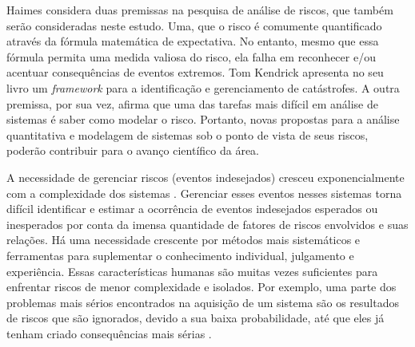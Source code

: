 Haimes \cite{Haimes2009} considera duas premissas na pesquisa de análise de riscos, que também serão consideradas neste estudo. Uma, que o risco é comumente quantificado através da fórmula matemática de expectativa. No entanto, mesmo que essa fórmula permita uma medida valiosa do risco, ela falha em reconhecer e/ou acentuar consequências de eventos extremos. Tom Kendrick apresenta no seu livro \cite{KEND2003BOOK} um \textit{framework} para a identificação e gerenciamento de catástrofes. A outra premissa, por sua vez, afirma que uma das tarefas mais difícil em análise de sistemas é saber como modelar o risco. Portanto, novas propostas para a análise quantitativa e modelagem de sistemas sob o ponto de vista de seus riscos, poderão contribuir para o avanço científico da área.

A necessidade de gerenciar riscos (eventos indesejados) cresceu exponencialmente com a complexidade dos sistemas \cite{higuera1996software}. Gerenciar esses eventos nesses sistemas torna difícil identificar e estimar a ocorrência de eventos indesejados esperados ou inesperados por conta da imensa quantidade de fatores de riscos envolvidos e suas relações. Há uma necessidade crescente por métodos mais sistemáticos e ferramentas para suplementar o conhecimento individual, julgamento e experiência. Essas características humanas são muitas vezes suficientes para enfrentar riscos de menor complexidade e isolados. Por exemplo, uma parte dos problemas mais sérios encontrados na aquisição de um sistema são os resultados de riscos que são ignorados, devido a sua baixa probabilidade, até que eles já tenham criado consequências mais sérias \cite{higuera1996software}.

